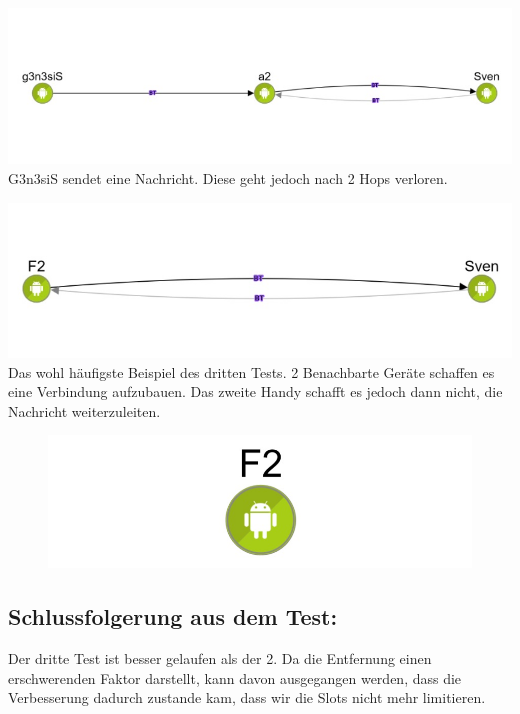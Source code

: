 \includegraphics[width=1.0\textwidth]{belege/grosstests/Bilder/Grosstest2/Test3Misserfolg1.jpg}
G3n3siS sendet eine Nachricht. Diese geht jedoch nach 2 Hops verloren.

\includegraphics[width=1.0\textwidth]{belege/grosstests/Bilder/Grosstest2/Test3Misserfolg2.jpg}
Das wohl häufigste Beispiel des dritten Tests. 2 Benachbarte Geräte
schaffen es eine Verbindung aufzubauen. Das zweite Handy schafft es
jedoch dann nicht, die Nachricht weiterzuleiten.

\begin{figure}[htbp]
\centering
\includegraphics[width=1.0\textwidth]{belege/grosstests/Bilder/Grosstest2/Test3Misserfolg3.jpg}
\caption{}
\end{figure}

\clearpage\subsection{Schlussfolgerung aus dem
Test:}\label{schlussfolgerung-aus-dem-test-4}

Der dritte Test ist besser gelaufen als der 2. Da die Entfernung einen
erschwerenden Faktor darstellt, kann davon ausgegangen werden, dass die
Verbesserung dadurch zustande kam, dass wir die Slots nicht mehr
limitieren.

